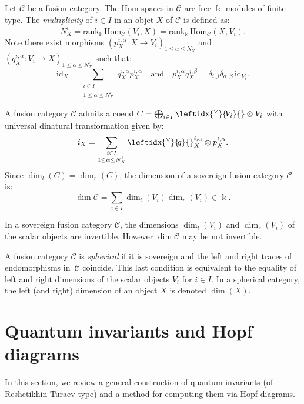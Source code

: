 \documentclass[a4paper]{amsart}
\theoremstyle{definition}
\newcommand{\co}{\colon}
\newcommand{\id}{\mathrm{id}}
\newcommand{\cc}{\mathcal{C}}
\newcommand{\kk}{\Bbbk}
\newcommand{\Hom}{\mathrm{Hom}}
\newcommand{\rank}{\mathrm{rank}}
\newcommand{\ldual}[1]{\leftidx{^\vee}{\!#1}{}}
\begin{document}
Let $\cc$ be a fusion category. The $\Hom$ spaces in $\cc$ are
free $\kk$-modules of finite type. The \emph{multiplicity} of $i\in I$ in an objet $X$ of $\cc$ is defined as:
\begin{equation*}
N^i_X=\rank_\kk \,\Hom_\cc(V_i,X)=\rank_\kk \,\Hom_\cc(X,V_i).
\end{equation*}
Note there exist morphisms $(p_X^{i,\alpha} \co X \to V_i)_{1 \leq \alpha \leq N^i_X}$ and $(q_X^{i,\alpha}\co V_i \to X)_{1
\leq \alpha \leq N^i_X}$ such that:
\begin{equation*}
\id_X=\!\!\!\!\!\sum_{\substack{i \in I \\ 1 \leq \alpha \leq N^i_X}} \!\!\!q_X^{i,\alpha}p_X^{i,\alpha} \quad \text{and}
\quad p_X^{i,\alpha}q_X^{j,\beta}=\delta_{i,j}\delta_{\alpha,\beta} \, \id_{V_i}.
\end{equation*}

A fusion category $\cc$ admits a coend  $C=\bigoplus_{i \in I} \ldual{V_i} \otimes V_i$ with universal dinatural transformation
given by:
\begin{equation*}
i_X=\sum_{\substack{i\in I \\ 1 \leq \alpha \leq N_X^i}} \ldual{q}_X^{i,\alpha}\otimes p_X^{i,\alpha}.
\end{equation*}
Since $\dim_l(C)=\dim_r(C)$,  the dimension of a sovereign fusion category $\cc$ is:
\begin{equation*}
\dim \cc=\sum_{i \in I} \dim_l(V_i) \dim_r(V_i) \in \kk.
\end{equation*}

In a sovereign fusion category $\cc$, the dimensions $\dim_l(V_i)$ and $\dim_r(V_i)$ of the scalar objects are invertible. However $\dim \cc$ may be not invertible.

A fusion category $\cc$ is \emph{spherical} if it is sovereign and the left and right traces of endomorphisms in~$\cc$
coincide. This last condition is equivalent to the equality of left and right dimensions of the scalar objects $V_i$ for
$i\in I$. In a spherical category, the left (and right) dimension of an object $X$ is denoted $\dim(X)$.

\section{Quantum invariants and Hopf diagrams}\label{Sect-invquant}
In this section, we review a general construction of quantum invariants (of Reshetikhin-Turaev type) and a method for computing them via Hopf diagrams.
\end{document}
